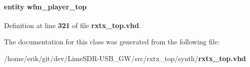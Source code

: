 \paragraph[{wfm\+\_\+player\+\_\+top\+\_\+inst2}]{ {\bfseries \textcolor{keywordflow}{entity}\textcolor{vhdlchar}{ }\textcolor{vhdlchar}{wfm\+\_\+player\+\_\+top}\textcolor{vhdlchar}{ }} \hspace{0.3cm}{\ttfamily [Instantiation]}}\label{classrxtx__top_1_1arch_a0394085efe339381a2d54a5edb579a95}


Definition at line {\bf 321} of file {\bf rxtx\+\_\+top.\+vhd}.



The documentation for this class was generated from the following file\+:\begin{DoxyCompactItemize}
\item 
/home/erik/git/dev/\+Lime\+S\+D\+R-\/\+U\+S\+B\+\_\+\+G\+W/src/rxtx\+\_\+top/synth/{\bf rxtx\+\_\+top.\+vhd}\end{DoxyCompactItemize}
